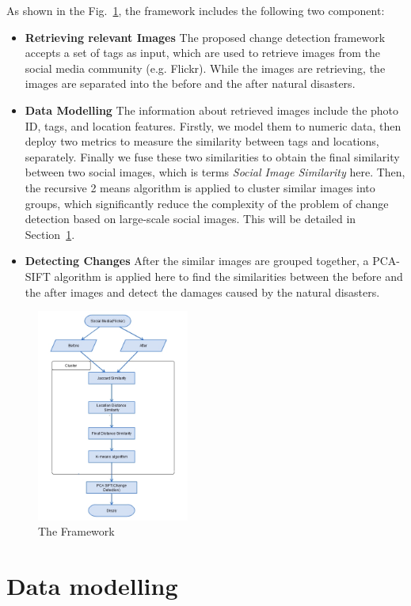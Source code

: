 \documentclass[runningheads,a4paper]{llncs}
\begin{document}
As shown in the Fig.~\ref{fig:Frame},
the framework includes the following two component:
\begin{itemize}
\item {\bf Retrieving relevant Images} The proposed change detection framework accepts a set of tags as input,
which are used to retrieve images from the social media community (e.g. Flickr).
While the images are retrieving, the images are separated into the before and the after natural disasters.
\item {\bf Data Modelling} The information about retrieved images include the photo ID, tags, and location features.
Firstly, we model them to numeric data, then deploy two metrics to measure the similarity between tags and locations, separately. 
Finally we fuse these two similarities to obtain the final similarity between two social images, which is terms \emph{Social Image Similarity} here. 
Then, the recursive 2 means algorithm is applied to cluster similar images into groups,
which significantly reduce the complexity of the problem of change detection based on large-scale social images. 
This will be detailed in Section~\ref{sec-datamodelling}. 
\item {\bf Detecting Changes} After the similar images are grouped together, a PCA-SIFT algorithm is applied here to find the similarities between the before and the after images and detect the damages caused by the natural disasters. 
\end{itemize}

\begin{figure}[h]
	\centering
		\includegraphics[width=5cm]{frame.png}	
\caption{The Framework} \label{fig:Frame}
\end{figure}

\section{Data modelling} \label{sec-datamodelling}
\end{document}
